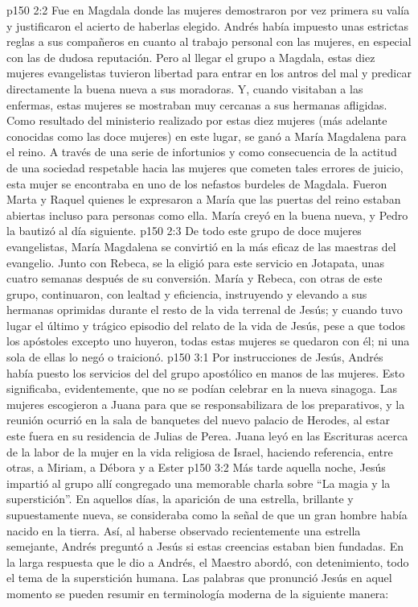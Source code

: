\vs p150 2:2 Fue en Magdala donde las mujeres demostraron por vez primera su valía y justificaron el acierto de haberlas elegido. Andrés había impuesto unas estrictas reglas a sus compañeros en cuanto al trabajo personal con las mujeres, en especial con las de dudosa reputación. Pero al llegar el grupo a Magdala, estas diez mujeres evangelistas tuvieron libertad para entrar en los antros del mal y predicar directamente la buena nueva a sus moradoras. Y, cuando visitaban a las enfermas, estas mujeres se mostraban muy cercanas a sus hermanas afligidas. Como resultado del ministerio realizado por estas diez mujeres (más adelante conocidas como las doce mujeres) en este lugar, se ganó a María Magdalena para el reino. A través de una serie de infortunios y como consecuencia de la actitud de una sociedad respetable hacia las mujeres que cometen tales errores de juicio, esta mujer se encontraba en uno de los nefastos burdeles de Magdala. Fueron Marta y Raquel quienes le expresaron a María que las puertas del reino estaban abiertas incluso para personas como ella. María creyó en la buena nueva, y Pedro la bautizó al día siguiente.
\vs p150 2:3 De todo este grupo de doce mujeres evangelistas, María Magdalena se convirtió en la más eficaz de las maestras del evangelio. Junto con Rebeca, se la eligió para este servicio en Jotapata, unas cuatro semanas después de su conversión. María y Rebeca, con otras de este grupo, continuaron, con lealtad y eficiencia, instruyendo y elevando a sus hermanas oprimidas durante el resto de la vida terrenal de Jesús; y cuando tuvo lugar el último y trágico episodio del relato de la vida de Jesús, pese a que todos los apóstoles excepto uno huyeron, todas estas mujeres se quedaron con él; ni una sola de ellas lo negó o traicionó.
\vs p150 3:1 Por instrucciones de Jesús, Andrés había puesto los servicios del  del grupo apostólico en manos de las mujeres. Esto significaba, evidentemente, que no se podían celebrar en la nueva sinagoga. Las mujeres escogieron a Juana para que se responsabilizara de los preparativos, y la reunión ocurrió en la sala de banquetes del nuevo palacio de Herodes, al estar este fuera en su residencia de Julias de Perea. Juana leyó en las Escrituras acerca de la labor de la mujer en la vida religiosa de Israel, haciendo referencia, entre otras, a Miriam, a Débora y a Ester
\vs p150 3:2 \pc Más tarde aquella noche, Jesús impartió al grupo allí congregado una memorable charla sobre “La magia y la superstición”. En aquellos días, la aparición de una estrella, brillante y supuestamente nueva, se consideraba como la señal de que un gran hombre había nacido en la tierra. Así, al haberse observado recientemente una estrella semejante, Andrés preguntó a Jesús si estas creencias estaban bien fundadas. En la larga respuesta que le dio a Andrés, el Maestro abordó, con detenimiento, todo el tema de la superstición humana. Las palabras que pronunció Jesús en aquel momento se pueden resumir en terminología moderna de la siguiente manera:
